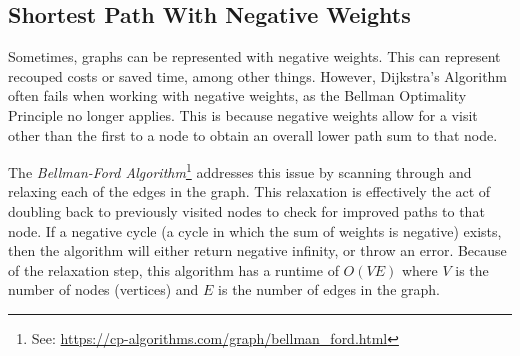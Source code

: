 \subsection*{Shortest Path With Negative Weights} %

Sometimes, graphs can be represented with negative weights. This can represent recouped costs or saved time, among other things.
However, Dijkstra's Algorithm often fails when working with negative weights, as the Bellman Optimality Principle no longer applies.
This is because negative weights allow for a visit other than the first to a node to obtain an overall lower path sum to that node.

The \emph{Bellman-Ford Algorithm}\footnote{See: \url{https://cp-algorithms.com/graph/bellman_ford.html}} addresses this issue by scanning through and relaxing each of the edges in the graph.
This relaxation is effectively the act of doubling back to previously visited nodes to check for improved paths to that node.
If a negative cycle (a cycle in which the sum of weights is negative) exists, then the algorithm will either return negative infinity, or throw an error.
Because of the relaxation step, this algorithm has a runtime of $O(VE)$ where $V$ is the number of nodes (vertices) and $E$ is the number of edges in the graph.
